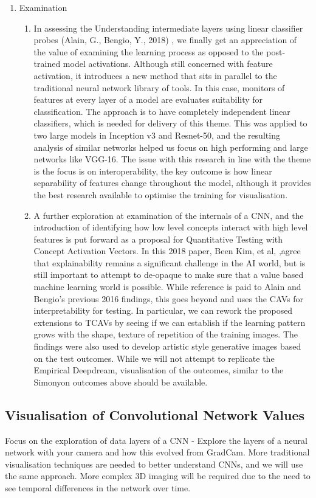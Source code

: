 \begin{enumerate}
    \item Examination
    \begin{enumerate}
        \item In assessing the Understanding intermediate layers using linear classifier probes (Alain, G., Bengio, Y., 2018) , we finally get an appreciation of the value of examining the learning process as opposed to the post-trained model activations. Although still concerned with feature activation, it introduces a new method that sits in parallel to the traditional neural network library of tools. In this case, monitors of features at every layer of a model are evaluates suitability for classification. The approach is to have completely independent linear classifiers, which is needed for delivery of this theme. This was applied to two large models in Inception v3 and Resnet-50, and the resulting analysis of similar networks helped us focus on high performing and large networks like VGG-16. The issue with this research in line with the theme is the focus is on interoperability, the key outcome is how linear separability of features change throughout the model, although it provides the best research available to optimise the training for visualisation.
        \item A further exploration at examination of the internals of a CNN, and the introduction of identifying how low level concepts interact with high level features is put forward as a proposal for Quantitative Testing with Concept Activation Vectors. In this 2018 paper, Been Kim, et al, ,agree that explainability remains a significant challenge in the AI world, but is still important to attempt to de-opaque to make sure that a value based machine learning world is possible. While reference is paid to Alain and Bengio’s previous 2016 findings, this goes beyond and uses the CAVs for interpretability for testing. In particular, we can rework the proposed extensions to TCAVs by seeing if we can establish if the learning pattern grows with the shape, texture of repetition of the training images.  The findings were also used to develop artistic style generative images based on the test outcomes. While we will not attempt to replicate the Empirical Deepdream, visualisation of the outcomes, similar to the Simonyon outcomes above should be available.
    \end{enumerate}
\end{enumerate}

\subsection{Visualisation of Convolutional Network Values}
Focus on the exploration of data layers of a CNN - Explore the layers of a neural network with your camera and how this evolved from GradCam. More traditional visualisation techniques are needed to better understand CNNs, and we will use the same approach. More complex 3D imaging will be required due to the need to see temporal differences in the network over time.

